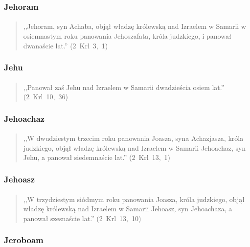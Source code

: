 \documentclass[10pt,a4paper,oneside]{article}
\begin{document}
\subsubsection{Jehoram}
\paragraph{}
\begin{quote}
,,Jehoram, syn Achaba, objął władzę królewską nad Izraelem w Samarii w osiemnastym roku panowania Jehoszafata, króla judzkiego, i panował dwanaście lat.'' \mbox{(2 Krl 3, 1)}
\end{quote}
\subsubsection{Jehu}
\paragraph{}
\begin{quote}
,,Panował zaś Jehu nad Izraelem w Samarii dwadzieścia osiem lat.'' \mbox{(2 Krl 10, 36)}
\end{quote}
\subsubsection{Jehoachaz}
\paragraph{}
\begin{quote}
,,W dwudziestym trzecim roku panowania Joasza, syna Achazjasza, króla judzkiego, objął władzę królewską nad Izraelem w Samarii Jehoachaz, syn Jehu, a panował siedemnaście lat.'' \mbox{(2 Krl 13, 1)}
\end{quote}
\subsubsection{Jehoasz}
\paragraph{}
\begin{quote}
,,W trzydziestym siódmym roku panowania Joasza, króla judzkiego, objął władzę królewską nad Izraelem w Samarii Jehoasz, syn Jehoachaza, a panował szesnaście lat.'' \mbox{(2 Krl 13, 10)}
\end{quote}
\subsubsection{Jeroboam}
\end{document}
